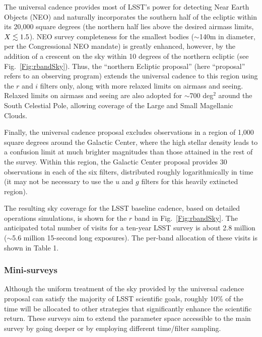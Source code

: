 \documentclass{emulateapj}
\begin{document}
The universal cadence provides most of LSST's power for detecting Near Earth 
Objects (NEO) and naturally incorporates the southern half of the ecliptic 
within its 20,000 square degrees (the northern half lies above the desired airmass 
limits, $X\lesssim1.5$). NEO survey completeness for the smallest bodies ($\sim$140m in 
diameter, per the Congressional NEO mandate) is greatly enhanced, however, by the 
addition of a crescent on the sky within 10 degrees of the northern ecliptic
(see Fig.~\ref{Fig:rbandSky}). Thus, the ``northern Ecliptic proposal'' (here ``proposal''
refers to an observing program) extends the universal cadence to this region using the
$r$ and $i$ filters only, along 
with more relaxed limits on airmass and seeing. Relaxed limits on airmass and 
seeing are also adopted for $\sim$700 deg$^2$ around the South Celestial 
Pole, allowing coverage of the Large and Small Magellanic Clouds.

Finally, the universal cadence proposal excludes observations in a region of 
1,000 square degrees around the Galactic Center, where the high stellar
density leads to a confusion limit at much brighter magnitudes than those 
attained in the rest of the survey. Within this region, the Galactic Center
proposal provides 30 observations in each of the six filters, distributed 
roughly logarithmically in time (it may not be necessary to use the
$u$ and $g$ filters for this heavily extincted region). 

The resulting sky coverage for the LSST baseline
cadence, based on detailed operations simulations, is shown for the 
$r$ band in Fig.~\ref{Fig:rbandSky}. The anticipated total number of visits 
for a ten-year LSST survey is about 2.8 million ($\sim$5.6 million 15-second long
exposures). The per-band allocation of these visits is shown in Table 1.



\subsubsection{ Mini-surveys}
\label{Sec:minisurveys}

Although the uniform treatment of the sky provided by the universal cadence
proposal can satisfy the majority of LSST scientific goals, roughly 10\%
of the time will be allocated to other strategies that significantly enhance the 
scientific return.  These surveys aim to extend the parameter space accessible 
to the main survey by going deeper or by employing different time/filter
sampling. 
\end{document}
